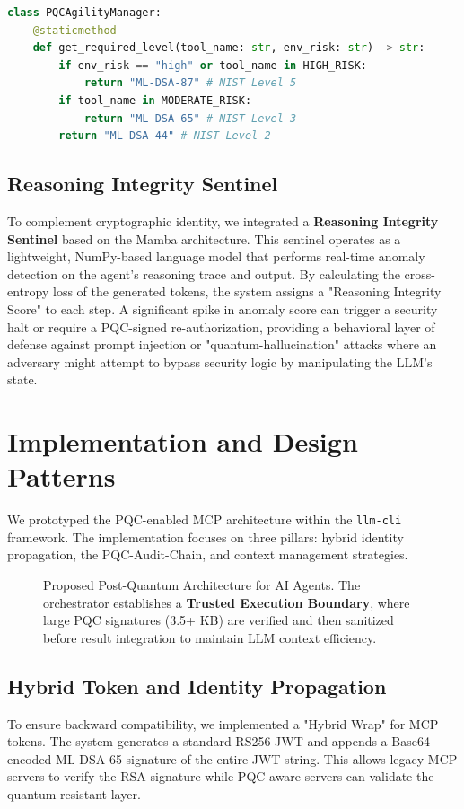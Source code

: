 \documentclass[conference]{IEEEtran}
\begin{document}
\begin{lstlisting}[language=Python, caption=Context-Adaptive Security Scaling in llm-cli]
class PQCAgilityManager:
    @staticmethod
    def get_required_level(tool_name: str, env_risk: str) -> str:
        if env_risk == "high" or tool_name in HIGH_RISK:
            return "ML-DSA-87" # NIST Level 5
        if tool_name in MODERATE_RISK:
            return "ML-DSA-65" # NIST Level 3
        return "ML-DSA-44" # NIST Level 2
\end{lstlisting}

\subsection{Reasoning Integrity Sentinel}
To complement cryptographic identity, we integrated a \textbf{Reasoning Integrity Sentinel} based on the Mamba architecture. This sentinel operates as a lightweight, NumPy-based language model that performs real-time anomaly detection on the agent's reasoning trace and output. By calculating the cross-entropy loss of the generated tokens, the system assigns a "Reasoning Integrity Score" to each step. A significant spike in anomaly score can trigger a security halt or require a PQC-signed re-authorization, providing a behavioral layer of defense against prompt injection or "quantum-hallucination" attacks where an adversary might attempt to bypass security logic by manipulating the LLM's state.

\section{Implementation and Design Patterns}
We prototyped the PQC-enabled MCP architecture within the \texttt{llm-cli} framework. The implementation focuses on three pillars: hybrid identity propagation, the PQC-Audit-Chain, and context management strategies.

\begin{figure}[htbp]
    \centering
    \resizebox{\linewidth}{!}{}
    \caption{Proposed Post-Quantum Architecture for AI Agents. The orchestrator establishes a \textbf{Trusted Execution Boundary}, where large PQC signatures (3.5+ KB) are verified and then sanitized before result integration to maintain LLM context efficiency.}
    \label{fig:architecture}
\end{figure}

\subsection{Hybrid Token and Identity Propagation}
To ensure backward compatibility, we implemented a "Hybrid Wrap" for MCP tokens. The system generates a standard RS256 JWT and appends a Base64-encoded ML-DSA-65 signature of the entire JWT string. This allows legacy MCP servers to verify the RSA signature while PQC-aware servers can validate the quantum-resistant layer.
\end{document}
